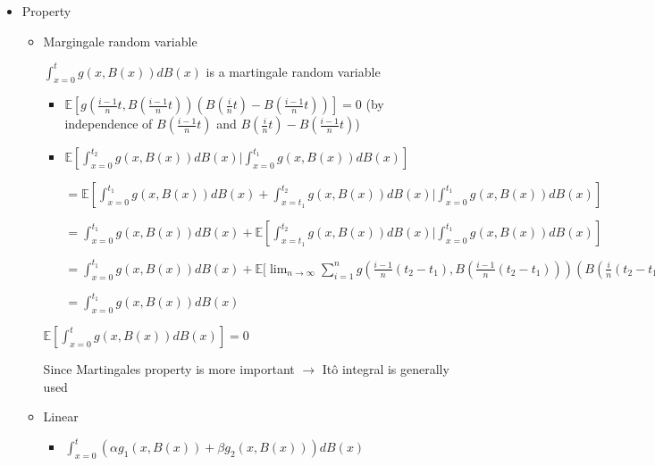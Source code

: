 \documentclass[a4paper]{article}
\begin{document}
\begin{itemize}
\begin{itemize}
\begin{enumerate}
\begin{enumerate}
                                $+ \frac{1}{2} \sum_{i=1}^n \frac{\partial g(x_1 + \delta_{x_1}, \dots, x_n + \delta_{x_n})}{\partial x_i^2} (d x_i)^2 + \sum_{i < j} \frac{\partial g(x_1 + \delta_{x_1}, \dots, x_n + \delta_{x_n})}{\partial x_i \partial x_j} d x_i d x_j$ (by Taylor series for chain rule)
                        \end{enumerate}
                \end{enumerate}
            \item Property
                \begin{itemize}
                    \item Margingale random variable

                        $\int_{x=0}^t g(x, B(x)) dB(x)$ is a martingale random variable
                        \begin{itemize}
                            \item $\mathbb{E}[g(\frac{i-1}{n}t, B(\frac{i-1}{n}t)) (B(\frac{i}{n}t) - B(\frac{i-1}{n}t))] = 0$ (by independence of $B(\frac{i-1}{n}t)$ and $B(\frac{i}{n}t) - B(\frac{i-1}{n}t)$)
                            \item $\mathbb{E}[\int_{x=0}^{t_2} g(x, B(x)) dB(x)|\int_{x=0}^{t_1} g(x, B(x)) dB(x)]$

                            $= \mathbb{E}[\int_{x=0}^{t_1} g(x, B(x)) dB(x) + \int_{x=t_1}^{t_2} g(x, B(x)) dB(x)|\int_{x=0}^{t_1} g(x, B(x)) dB(x)]$

                            $= \int_{x=0}^{t_1} g(x, B(x)) dB(x) + \mathbb{E}[\int_{x=t_1}^{t_2} g(x, B(x)) dB(x)|\int_{x=0}^{t_1} g(x, B(x)) dB(x)]$

                            $= \int_{x=0}^{t_1} g(x, B(x)) dB(x) + \mathbb{E}[\lim_{n \rightarrow \infty} \sum_{i=1}^n g(\frac{i-1}{n}(t_2-t_1), B(\frac{i-1}{n}(t_2-t_1))) (B(\frac{i}{n}(t_2 - t_1)) - B(\frac{i-1}{n}(t_2 - t_1)))$

                            $= \int_{x=0}^{t_1} g(x, B(x)) dB(x)$
                        \end{itemize}
                        $\mathbb{E}[\int_{x=0}^t g(x, B(x)) dB(x)] = 0$

                        Since Martingales property is more important $\rightarrow$ It\^{o} integral is generally used
                    \item Linear
                        \begin{itemize}
                            \item $\int_{x=0}^t (\alpha g_1(x, B(x)) + \beta g_2(x, B(x)) ) dB(x)$


\end{itemize}
\end{itemize}
\end{itemize}
\end{itemize}
\end{document}
